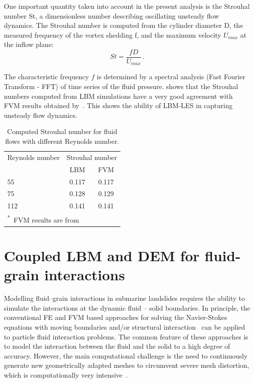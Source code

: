 One important quantity taken into account in the present analysis is the 
Strouhal number St, a dimensionless number describing oscillating unsteady 
flow dynamics. The Strouhal number is computed from the cylinder diameter D, 
the measured frequency of the vortex shedding f, and the maximum velocity 
$U_{max}$ at the inflow plane:
%
\begin{equation}
St=\frac{fD}{U_{max}}\,.
\end{equation}

\noindent The characteristic frequency $f$ is determined by a spectral 
analysis (Fast Fourier Transform - FFT) of time series of the fluid pressure. 
 shows that the Strouhal numbers computed from LBM 
simulations have a very good agreement with FVM results obtained 
by~\citet{Breuer2000}. This shows the ability of LBM-LES in capturing unsteady 
flow dynamics.


\begin{table}[tbhp]
	\caption{Computed Strouhal number for fluid flows with different Reynolds 
	number.}
	\label{table:strouhal}
	\centering
	\begin{tabular}{l c c}
		\toprule
		Reynolds number & \multicolumn{2}{c}{Strouhal number} \\
		\cmidrule{2-3}
		& LBM & FVM \\
		\midrule
		55		& 0.117	 &	0.117 \\
		75		& 0.128	 &	0.129 \\
		112		& 0.141  &	0.141 \\
		\bottomrule
		\multicolumn{3}{l}{\footnotesize{\textsuperscript{*}~FVM results are 
		from~\citet{Breuer2000}}}
	\end{tabular}
\end{table}




\section{Coupled LBM and DEM for fluid-grain interactions}
\label{sec:coupled_lbm_dem}
Modelling fluid--grain interactions in submarine landslides requires the 
ability to simulate the interactions at the dynamic fluid -- solid boundaries. 
In principle, the conventional FE and FVM based approaches for solving the 
Navier-Stokes equations with moving boundaries and/or structural 
interaction~\citep{Bathe2004} can be applied to particle fluid interaction 
problems. The common feature of these approaches is to model the interaction 
between the fluid and the solid to a high degree of accuracy. However, the main 
computational challenge is the need to continuously generate new geometrically 
adapted meshes to circumvent severe mesh distortion, which is computationally 
very intensive~\citep{Han2007a}. 

